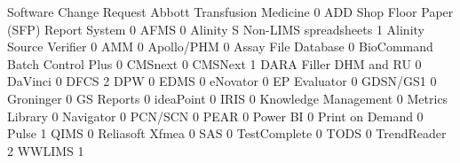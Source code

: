 \documentclass{article}
\begin{document}
\begin{Schunk}
\begin{Soutput}
                                           Software Change Request
  Abbott Transfusion Medicine                                    0
  ADD Shop Floor Paper (SFP) Report System                       0
  AFMS                                                           0
  Alinity S Non-LIMS spreadsheets                                1
  Alinity Source Verifier                                        0
  AMM                                                            0
  Apollo/PHM                                                     0
  Assay File Database                                            0
  BioCommand Batch Control Plus                                  0
  CMSnext                                                        0
  CMSNext                                                        1
  DARA Filler DHM and RU                                         0
  DaVinci                                                        0
  DFCS                                                           2
  DPW                                                            0
  EDMS                                                           0
  eNovator                                                       0
  EP Evaluator                                                   0
  GDSN/GS1                                                       0
  Groninger                                                      0
  GS Reports                                                     0
  ideaPoint                                                      0
  IRIS                                                           0
  Knowledge Management                                           0
  Metrics Library                                                0
  Navigator                                                      0
  PCN/SCN                                                        0
  PEAR                                                           0
  Power BI                                                       0
  Print on Demand                                                0
  Pulse                                                          1
  QIMS                                                           0
  Reliasoft Xfmea                                                0
  SAS                                                            0
  TestComplete                                                   0
  TODS                                                           0
  TrendReader                                                    2
  WWLIMS                                                         1


\end{Soutput}
\end{Schunk}
\end{document}
